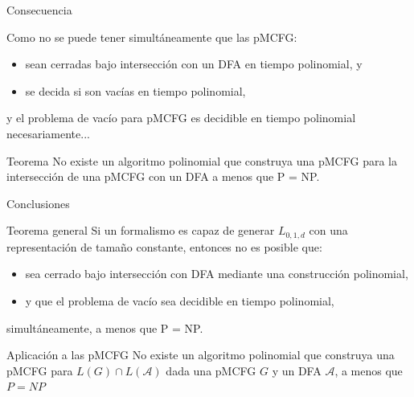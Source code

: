\documentclass{beamer}
\newcommand{\repeatlang}{L_{0,1,d}}
\begin{document}
\begin{frame}{Consecuencia}

    \pause

    Como no se puede tener simultáneamente que las pMCFG:

    \begin{itemize}
        \item sean cerradas bajo intersección con un DFA en tiempo polinomial, y
              \pause
        \item se decida si son vacías en tiempo polinomial,
    \end{itemize}

    y el problema de vacío para pMCFG es decidible en tiempo
    polinomial necesariamente...

    \pause

    \begin{block}{Teorema}
        No existe un algoritmo polinomial que construya una pMCFG para la intersección de una pMCFG con un DFA a menos que P = NP.
    \end{block}
\end{frame}

\begin{frame}{Conclusiones}

    \begin{block}{Teorema general}
        Si un formalismo es capaz de generar
        $\repeatlang$
        con una representación de tamaño constante, entonces no es posible que:

        \begin{itemize}
            \item sea cerrado bajo intersección con DFA mediante una construcción polinomial,
            \item y que el problema de vacío sea decidible en tiempo polinomial,
        \end{itemize}

        simultáneamente, a menos que P = NP.
    \end{block}

    \pause

    \begin{alertblock}{Aplicación a las pMCFG}
        No existe un algoritmo polinomial que construya una pMCFG para $L(G)\cap L(\mathcal A)$ dada una pMCFG $G$ y un DFA $\mathcal A$,
        a menos que  $P = NP$
    \end{alertblock}

\end{frame}
\end{document}
